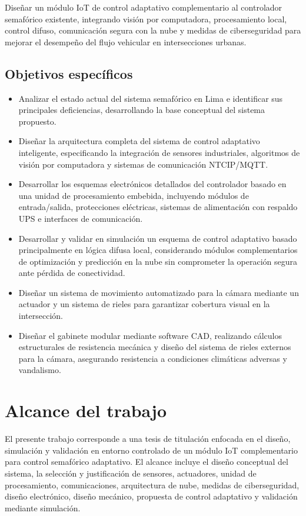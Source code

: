 \documentclass[12pt,a4paper,oneside]{report}
\begin{document}
Diseñar un módulo IoT de control adaptativo complementario al controlador semafórico existente, integrando visión por computadora, procesamiento local, control difuso, comunicación segura con la nube y medidas de ciberseguridad para mejorar el desempeño del flujo vehicular en intersecciones urbanas.

\subsection{Objetivos específicos}\label{objetivos-especuxedficos}

\begin{itemize}
\item
  Analizar el estado actual del sistema semafórico en Lima e identificar sus principales deficiencias, desarrollando la base conceptual del sistema propuesto.
\item
  Diseñar la arquitectura completa del sistema de control adaptativo inteligente, especificando la integración de sensores industriales, algoritmos de visión por computadora y sistemas de comunicación NTCIP/MQTT.
\item
  Desarrollar los esquemas electrónicos detallados del controlador basado en una unidad de procesamiento embebida, incluyendo módulos de entrada/salida, protecciones eléctricas, sistemas de alimentación con respaldo UPS e interfaces de comunicación.
\item
  Desarrollar y validar en simulación un esquema de control adaptativo basado principalmente en lógica difusa local, considerando módulos complementarios de optimización y predicción en la nube sin comprometer la operación segura ante pérdida de conectividad.
\item
  Diseñar un sistema de movimiento automatizado para la cámara mediante un actuador y un sistema de rieles para garantizar cobertura visual en la intersección.
\item
  Diseñar el gabinete modular mediante software CAD, realizando cálculos estructurales de resistencia mecánica y diseño del sistema de rieles externos para la cámara, asegurando resistencia a condiciones climáticas adversas y vandalismo.
\end{itemize}

\section{Alcance del trabajo}\label{alcance-del-trabajo}

El presente trabajo corresponde a una tesis de titulación enfocada en el diseño, simulación y validación en entorno controlado de un módulo IoT complementario para control semafórico adaptativo. El alcance incluye el diseño conceptual del sistema, la selección y justificación de sensores, actuadores, unidad de procesamiento, comunicaciones, arquitectura de nube, medidas de ciberseguridad, diseño electrónico, diseño mecánico, propuesta de control adaptativo y validación mediante simulación.
\end{document}
